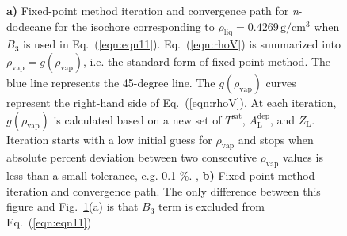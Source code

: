 \documentclass[5p,times]{elsarticle}
\begin{document}
\begin{figure}
\caption{
\textbf{a)} Fixed-point method iteration and convergence path for \textit{n}-dodecane for the isochore corresponding to $\rho_{\mathrm{liq}}=0.4269\,\mathrm{g/cm^3}$ when $B_3$ is used in Eq.~(\ref{eqn:eqn11}). Eq.~(\ref{eqn:rhoV}) is summarized into $\rho_{\mathrm{vap}}=g(\rho_{\mathrm{vap}})$, i.e. the standard form of fixed-point method. The blue line represents the 45-degree line. The $g(\rho_{\mathrm{vap}})$ curves represent the right-hand side of Eq.~(\ref{eqn:rhoV}). At each iteration, $g(\rho_{\mathrm{vap}})$ is calculated based on a new set of $T^{\mathrm{sat}}$, $A^{\mathrm{dep}}_{\mathrm{L}}$, and $Z_{\mathrm{L}}$. Iteration starts with a low initial guess for $\rho_{\mathrm{vap}}$ and stops when absolute percent deviation between two consecutive $\rho_{\mathrm{vap}}$ values is less than a small tolerance, e.g. 0.1 \%.
, \textbf{b)} Fixed-point method iteration and convergence path. The only difference between this figure and Fig.~\ref{fig:convergence-path}(a) is that $B_3$ term is excluded from Eq.~(\ref{eqn:eqn11})
}
\label{fig:convergence-path}
\end{figure}



\end{document}
